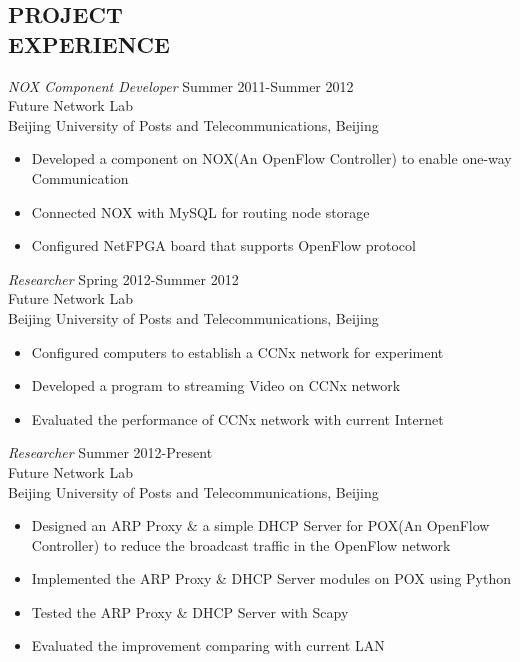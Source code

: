\documentclass[margin]{res}
\begin{document}
\begin{resume}
\section{PROJECT \\ EXPERIENCE} 
    {\sl NOX Component Developer} 
        \hfill Summer 2011-Summer 2012 \\
        Future Network Lab \\
        Beijing University of Posts and Telecommunications, Beijing
        \begin{itemize}  
            \itemsep -2pt %
            \item Developed a component on NOX(An OpenFlow Controller) to enable one-way Communication
            \item Connected NOX with MySQL for routing node storage
            \item Configured NetFPGA board that supports OpenFlow protocol  
        \end{itemize}
 
    {\sl Researcher} 
        \hfill  Spring 2012-Summer 2012 \\
        Future Network Lab \\
        Beijing University of Posts and Telecommunications, Beijing 
        \begin{itemize}  
            \itemsep -2pt %
            \item Configured computers to establish a CCNx network for experiment
            \item Developed a program to streaming Video on CCNx network
            \item Evaluated the performance of CCNx network with current Internet
        \end{itemize} 
        
    {\sl Researcher}
        \hfill Summer 2012-Present \\
        Future Network Lab \\
        Beijing University of Posts and Telecommunications, Beijing
        \begin{itemize}
            \itemsep -2pt %
            \item Designed an ARP Proxy \& a simple DHCP Server for POX(An OpenFlow Controller) to reduce the broadcast traffic in the OpenFlow network
            \item Implemented the ARP Proxy \& DHCP Server modules on POX using Python
            \item Tested the ARP Proxy \& DHCP Server with Scapy
            \item Evaluated the improvement comparing with current LAN 
        \end{itemize}                                                                        
        

\end{resume}
\end{document}
